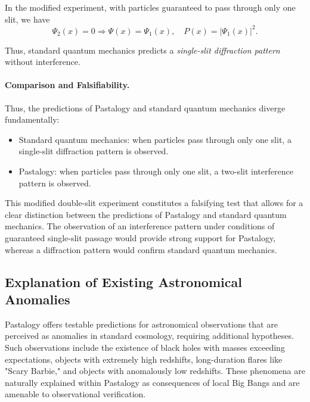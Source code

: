 \documentclass[pdflatex,sn-mathphys-num,referee]{sn-jnl}
\begin{document}
In the modified experiment, with particles guaranteed to pass through only one slit, we have
\begin{equation}
    \Psi_2(x) = 0 \Rightarrow \Psi(x) = \Psi_1(x), \quad P(x) = |\Psi_1(x)|^2.
\end{equation}

Thus, standard quantum mechanics predicts a \emph{single-slit diffraction pattern} without interference.

\paragraph{Comparison and Falsifiability.} Thus, the predictions of Pastalogy and standard quantum mechanics diverge fundamentally:
\begin{itemize}
    \item Standard quantum mechanics: when particles pass through only one slit, a single-slit diffraction pattern is observed.
    \item Pastalogy: when particles pass through only one slit, a two-slit interference pattern is observed.
\end{itemize}
This modified double-slit experiment constitutes a falsifying test that allows for a clear distinction between the predictions of Pastalogy and standard quantum mechanics. The observation of an interference pattern under conditions of guaranteed single-slit passage would provide strong support for Pastalogy, whereas a diffraction pattern would confirm standard quantum mechanics.

\subsection{Explanation of Existing Astronomical Anomalies}\label{subsec:astronomical-anomalies}

Pastalogy offers testable predictions for astronomical observations that are perceived as anomalies in standard cosmology, requiring additional hypotheses. Such observations include the existence of black holes with masses exceeding expectations, objects with extremely high redshifts, long-duration flares like "Scary Barbie," and objects with anomalously low redshifts. These phenomena are naturally explained within Pastalogy as consequences of local Big Bangs and are amenable to observational verification.
\end{document}
